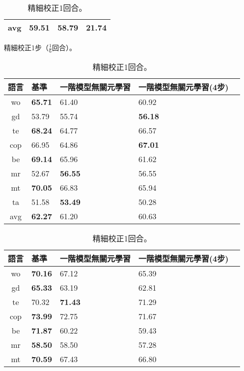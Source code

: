 \begin{table}[htbp]
\begin{subtable}[h]{0.8\textwidth}
\begin{tabular}[!ht]{c|lll}
                avg & \textbf{59.51} & 58.79 & 21.74 \\
                \hline
            \end{tabular}
        \caption{精細校正1步（$\frac{1}{6}$回合）。}
    \end{subtable}
    \vfill
    \begin{subtable}[h]{0.8\textwidth}
    \centering
        \begin{tabular}[!ht]{c|llll}
            \hline
            語言 & 基準 & 一階模型無關元學習 & 一階模型無關元學習(4步) \\
            \hline\hline
            wo & \textbf{65.71} & 61.40 & 60.92 \\
            gd & 53.79 & 55.74 & \textbf{56.18} \\
            te & \textbf{68.24} & 64.77 & 66.57 \\
            cop & 66.95 & 64.86 & \textbf{67.01} \\
            be & \textbf{69.14} & 65.96 & 61.62 \\
            mr & 52.67 & \textbf{56.55} & 56.55 \\
            mt & \textbf{70.05} & 66.83 & 65.94 \\
            ta & 51.58 & \textbf{53.49} & 50.28 \\
            \hline
            avg & \textbf{62.27} & 61.20 & 60.63 \\
            \hline
        \end{tabular}
        \caption{精細校正1回合。}
    \end{subtable}
    \vfill
    \begin{subtable}[h]{0.8\textwidth}
        \centering
            \begin{tabular}[!ht]{c|llll}
                \hline
                語言 & 基準 & 一階模型無關元學習 & 一階模型無關元學習(4步) \\
                \hline\hline
                wo & \textbf{70.16} & 67.12 & 65.39 \\
                gd & \textbf{65.33} & 63.19 & 62.81 \\
                te & 70.32 & \textbf{71.43} & 71.29 \\
                cop & \textbf{73.99} & 72.75 & 71.67 \\
                be & \textbf{71.87} & 60.22 & 59.43 \\
                mr & \textbf{58.50} & 58.50 & 57.28 \\
                mt & \textbf{70.59} & 67.43 & 66.80 \\

\end{tabular}
\end{subtable}
\end{table}
